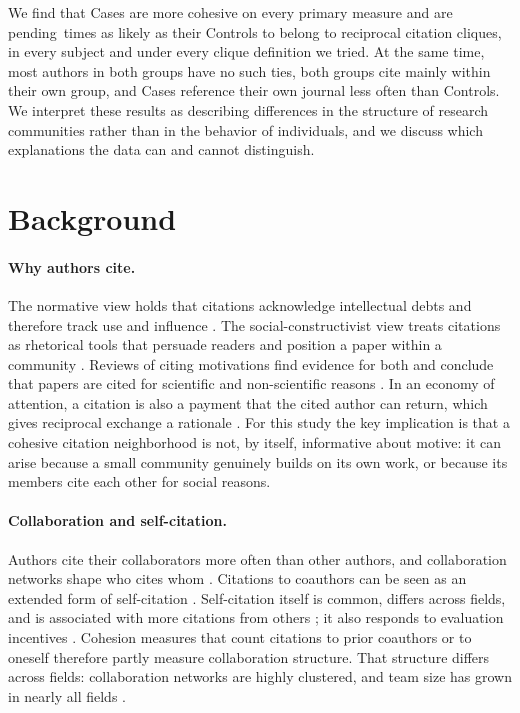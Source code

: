 \documentclass[12pt]{article}
\providecommand{\CliqueMembershipRatio}{pending}
\begin{document}
We find that Cases are more cohesive on every primary measure and are \CliqueMembershipRatio\ times as likely as their Controls to belong to reciprocal citation cliques, in every subject and under every clique definition we tried.  At the same time, most authors in both groups have no such ties, both groups cite mainly within their own group, and Cases reference their own journal less often than Controls.  We interpret these results as describing differences in the structure of research communities rather than in the behavior of individuals, and we discuss which explanations the data can and cannot distinguish.

\section{Background}
\label{sec:background}

\paragraph{Why authors cite.}  The normative view holds that citations acknowledge intellectual debts and therefore track use and influence \parencite{Merton1988}.  The social-constructivist view treats citations as rhetorical tools that persuade readers and position a paper within a community \parencite{Gilbert1977}.  Reviews of citing motivations find evidence for both and conclude that papers are cited for scientific and non-scientific reasons \parencite{Bornmann2008,Tahamtan2019}.  In an economy of attention, a citation is also a payment that the cited author can return, which gives reciprocal exchange a rationale \parencite{Franck1999}.  For this study the key implication is that a cohesive citation neighborhood is not, by itself, informative about motive: it can arise because a small community genuinely builds on its own work, or because its members cite each other for social reasons.

\paragraph{Collaboration and self-citation.}  Authors cite their collaborators more often than other authors, and collaboration networks shape who cites whom \parencite{Wallace2012,Martin2013}.  Citations to coauthors can be seen as an extended form of self-citation \parencite{Ioannidis2015}.  Self-citation itself is common, differs across fields, and is associated with more citations from others \parencite{Snyder1998,Aksnes2003,Fowler2007,Ioannidis2019}; it also responds to evaluation incentives \parencite{Seeber2019,Baccini2019}.  Cohesion measures that count citations to prior coauthors or to oneself therefore partly measure collaboration structure.  That structure differs across fields: collaboration networks are highly clustered, and team size has grown in nearly all fields \parencite{Newman2001,Moody2004,Wuchty2007}.
\end{document}
